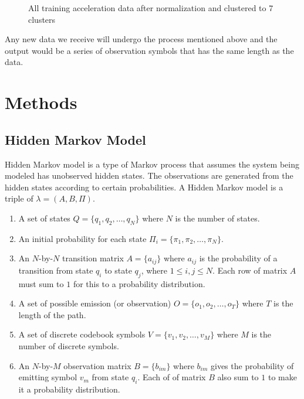 \documentclass[twoside]{article}
\begin{document}
\begin{multicols}{2}
\begin{enumerate}
\begin{figure}[H]
\caption{All training acceleration data after normalization and clustered to 7 clusters}
\label{fig:imu_cluster}
\end{figure}

\end{enumerate}
	Any new data we receive will undergo the process mentioned above and the output would be a series of observation symbols that has the same length as the data.


\section{Methods}
\subsection{Hidden Markov Model}
Hidden Markov model is a type of Markov process that assumes the system being modeled has unobserved hidden states. The observations are generated from the hidden states according to certain probabilities\cite{Elmez07}. A Hidden Markov model is a triple of $\lambda=(A, B, \Pi)$.
\begin{enumerate}
	\item A set of states $Q = \{q_1, q_2, \ldots, q_N\}$ where $N$ is the number of states.
	\item An initial probability for each state $\Pi_i =\{\pi_1, \pi_2, \ldots, \pi_N\}$.
	\item An $N$-by-$N$ transition matrix $A=\{a_{ij}\}$ where $a_{ij}$ is the probability of a transition from state $q_i$ to state $q_j$, where $1 \leq i,j \leq N$. Each row of matrix $A$ must sum to $1$ for this to a probability distribution.
	\item A set of possible emission (or observation) $O=\{o_1, o_2, \ldots, o_T\}$ where $T$ is the length of the path.
	\item A set of discrete codebook symbols $V = \{v_1, v_2, \ldots, v_M\}$ where $M$ is the number of discrete symbols.
	\item An $N$-by-$M$ observation matrix $B=\{b_{im}\}$ where $b_{im}$ gives the probability of emitting symbol $v_m$ from state $q_i$. Each of of matrix $B$ also sum to $1$ to make it a probability distribution.
\end{enumerate}


\end{multicols}
\end{document}
